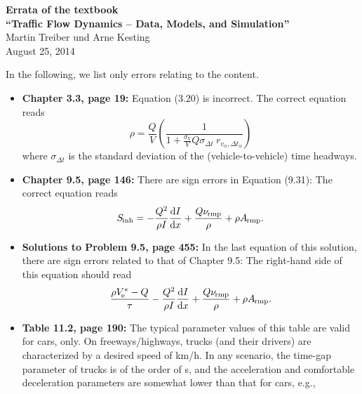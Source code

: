 \documentclass[11pt,a4paper]{scrreprt}
\providecommand{\be}{\begin{equation}}
\providecommand{\ee}{\end{equation}}
\providecommand{\bdm}{\begin{displaymath}}
\providecommand{\edm}{\end{displaymath}}
\providecommand{\secfont}[1]{{\Large\sf\textbf{#1}}}
\providecommand{\abl}[2]{\frac{{\rm d} #1}{{\rm d} #2}}  %
\providecommand{\sub}[1]{_{\text{{\scriptsize \hspace{-0.2ex}#1}}}}
\begin{document}
\begin{center}
\secfont{Errata of the textbook\\[0.3em]
``Traffic Flow Dynamics --  Data, Models, and Simulation''}
\\[1em]

Martin Treiber und Arne Kesting
\\[1em]

August 25, 2014
\end{center}
\vspace{1em}


In the following, we list only errors relating to the content.


\begin{itemize}

\item
\textbf{Chapter 3.3, page 19:}
Equation (3.20) is incorrect. The correct equation reads 
\setcounter{chapter}{3}
\setcounter{equation}{20}
\be
\rho=\frac{Q}{V}\left(\frac{1}{1+\frac{\sigma_V}{V}Q\sigma_{\Delta t} \
r_{v_{\alpha},\Delta t_{\alpha}}}\right)
\ee
where $\sigma_{\Delta t}$ is the standard deviation of the
(vehicle-to-vehicle) time headways.

\item
\textbf{Chapter 9.5, page 146:}
There are sign errors in Equation (9.31): The correct equation reads
\setcounter{chapter}{9}
\setcounter{equation}{30}
\be
S\sub{inh}=-\frac{Q^2}{\rho I} \abl{I}{x}
+\frac{Q \nu\sub{rmp}}{\rho}+\rho A\sub{rmp}.
\ee

\item \textbf{Solutions to Problem 9.5, page 455:}
In the last equation of this solution, there are sign errors related to that of Chapter
9.5: The right-hand side of this equation should read
\bdm
\frac{\rho V^*\sub{e}-Q}{\tau} -\frac{Q^2}{\rho I} \abl{I}{x}
+\frac{Q \nu\sub{rmp}}{\rho}+\rho A\sub{rmp}.
\edm


\item \textbf{Table 11.2, page 190:}
The typical parameter values of this table are valid for cars, only. On freeways/highways, trucks (and
their drivers) are characterized by a desired speed of
\unit[80]{km/h}. In any scenario, the time-gap parameter of  trucks is
 of the order of \unit[2]{s}, and the 
acceleration and comfortable deceleration parameters are somewhat
lower than that for cars, e.g.,


\end{itemize}
\end{document}
